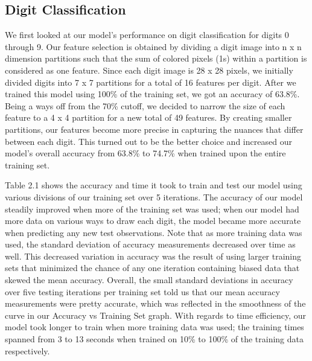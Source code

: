 \documentclass[10pt,parskip=half,
toc=sectionentrywithdots,
bibliography=totocnumbered,
captions=tableheading,numbers=noendperiod]{scrartcl}
\begin{document}
\hypertarget{digit-classification}{%
\subsection{Digit Classification}\label{digit-classification}}

We first looked at our model's performance on digit classification for
digits 0 through 9. Our feature selection is obtained by dividing a
digit image into n x n dimension partitions such that the sum of colored
pixels (1s) within a partition is considered as one feature. Since each
digit image is 28 x 28 pixels, we initially divided digits into 7 x 7
partitions for a total of 16 features per digit. After we trained this
model using 100\% of the training set, we got an accuracy of 63.8\%.
Being a ways off from the 70\% cutoff, we decided to narrow the size of
each feature to a 4 x 4 partition for a new total of 49 features. By
creating smaller partitions, our features become more precise in
capturing the nuances that differ between each digit. This turned out to
be the better choice and increased our model's overall accuracy from
63.8\% to 74.7\% when trained upon the entire training set.

Table 2.1 shows the accuracy and time it took to train and test our
model using various divisions of our training set over 5 iterations. The
accuracy of our model steadily improved when more of the training set
was used; when our model had more data on various ways to draw each
digit, the model became more accurate when predicting any new test
observations. Note that as more training data was used, the standard
deviation of accuracy measurements decreased over time as well. This
decreased variation in accuracy was the result of using larger training
sets that minimized the chance of any one iteration containing biased
data that skewed the mean accuracy. Overall, the small standard
deviations in accuracy over five testing iterations per training set
told us that our mean accuracy measurements were pretty accurate, which
was reflected in the smoothness of the curve in our Accuracy vs Training
Set graph. With regards to time efficiency, our model took longer to
train when more training data was used; the training times spanned from
3 to 13 seconds when trained on 10\% to 100\% of the training data
respectively.
\end{document}

